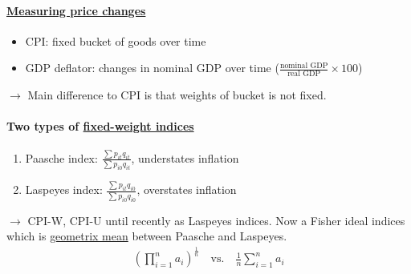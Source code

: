 \paragraph{\underline{Measuring price changes}}
\begin{itemize}
\item CPI: fixed bucket of goods over time
\item GDP deflator: changes in nominal GDP over time ($\frac{\text{nominal GDP}}{\text{real GDP}}\times 100$)
\end{itemize}
$\to$ Main difference to CPI is that weights of bucket is not fixed.
\paragraph{Two types of \underline{fixed-weight indices}}
\begin{enumerate}[(1)]
\item Paasche index: $\frac{\sum p_{it}q_{it}}{\sum p_{i0}q_{it}}$, understates inflation
\item Laspeyes index: $\frac{\sum p_{it}q_{i0}}{\sum p_{i0}q_{i0}}$, overstates inflation
\end{enumerate}
$\to$ CPI-W, CPI-U until recently as Laspeyes indices. Now a Fisher ideal indices which is \underline{geometrix mean} between Paasche and Laspeyes.
\begin{eqnarray*}
(\prod^{n}_{i=1}a_{i})^{\frac{1}{n}}\quad\text{vs.}\quad\frac{1}{n}\sum^{n}_{i=1}a_{i}
\end{eqnarray*}

